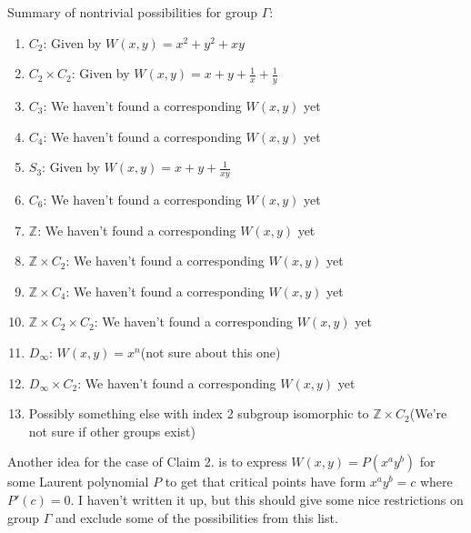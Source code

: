 \documentclass[a4paper]{article}
\begin{document}
Summary of nontrivial possibilities for group $\Gamma$:
\begin{enumerate}
	\item $C_2$: Given by $W(x,y) = x^2 + y^2+ x y$ 
	\item $C_2 \times C_2$: Given by $W(x,y) = x+ y +\frac{1}{x}+\frac{1}{y}$
	\item $C_3$: We haven't found a corresponding $W(x,y)$ yet
	\item $C_4$: We haven't found a corresponding $W(x,y)$ yet
	\item $S_3$: Given by $W(x,y) = x + y +\frac{1}{xy}$
	\item $C_6$: We haven't found a corresponding $W(x,y)$ yet
	\item $\mathbb{Z}$: We haven't found a corresponding $W(x,y)$ yet
	\item $\mathbb{Z} \times C_2$: We haven't found a corresponding $W(x,y)$ yet
	\item $\mathbb{Z} \times C_4$: We haven't found a corresponding $W(x,y)$ yet
	\item $\mathbb{Z} \times C_2 \times C_2$: We haven't found a corresponding $W(x,y)$ yet
	\item $D_\infty$: $W(x,y) = x^n$(not sure about this one)
	\item $D_\infty \times C_2$: We haven't found a corresponding $W(x,y)$ yet
	\item Possibly something else with index 2 subgroup isomorphic to $\mathbb{Z} \times C_2$(We're not sure if other groups exist)
\end{enumerate}

Another idea for the case of Claim 2. is to express $W(x,y) = P(x^a y^b)$ for some Laurent polynomial $P$ to get that critical points have form $x^a y^b = c$ where $P'(c) = 0$. I haven't written it up, but this should give some nice restrictions on group $\Gamma$ and exclude some of the possibilities from this list.
\end{document}
